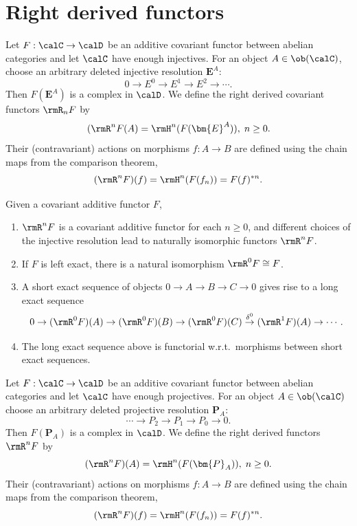 \section{Right derived functors}

\begin{defn}
    Let $F:\calC\to \calD$ be an additive covariant functor between abelian categories and let $\calC$ have enough injectives. For an object $A\in\ob(\calC)$, choose an arbitrary deleted injective resolution $\bm{E}^A$:
    \[0\to E^0\to E^1\to E^2\to\cdots.\]
    Then $F(\bm{E}^A)$ is a complex in $\calD$. We define the right derived covariant functors $\rmR_nF$ by
    \[(\rmR^nF(A)=\rmH^n(F(\bm{E}^A)),\; n\geq 0.\]
    Their (contravariant) actions on morphisms $f:A\to B$ are defined using the chain maps from the comparison theorem,
    \[(\rmR^nF)(f)=\rmH^n(F(f_n))=F(f)^{\ast n}.\]
\end{defn}

\begin{thm}
    Given a covariant additive functor $F$, 
    \begin{enumerate}
        \item $\rmR^nF$ is a covariant additive functor for each $n\geq 0$, and different choices of the injective resolution lead to naturally isomorphic functors $\rmR^nF$.
        \item If $F$ is left exact, there is a natural isomorphism $\rmR^0F\cong F$.
        \item A short exact sequence of objects $0\to A\to B\to C\to 0$ gives rise to a long exact sequence 
        \[0\to (\rmR^0F)(A)\to (\rmR^0F)(B)\to (\rmR^0F)(C)\overset{\delta^0}{\to} (\rmR^1F)(A)\to \cdots.\]
        \item The long exact sequence above is functorial w.r.t.\ morphisms between short exact sequences.
    \end{enumerate}
\end{thm}

\begin{defn}
    Let $F:\calC\to \calD$ be an additive covariant functor between abelian categories and let $\calC$ have enough projectives. For an object $A\in \ob(\calC)$ choose an arbitrary deleted projective resolution $\bm{P}_A$:
    \[\cdots \to P_2\to P_1\to P_0 \to 0.\]
    Then $F(\bm{P}_A)$ is a complex in $\calD$. We define the right derived functors $\rmR^nF$ by 
    \[(\rmR^n F) (A)=\rmH^n(F(\bm{P}_A)), \; n\geq 0.\]
    Their (contravariant) actions on morphisms $f:A\to B$ are defined using the chain maps from the comparison theorem, \[(\rmR^n F)(f)=\rmH^n(F(f_n))=F(f)^{\ast n}.\]
\end{defn}

